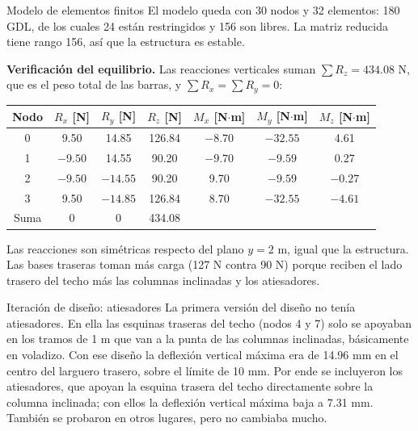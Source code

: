 \begin{desarrollo}{Modelo de elementos finitos}
El modelo queda con 30 nodos y 32 elementos: 180 GDL, de los cuales 24
están restringidos y 156 son libres. La matriz reducida tiene rango 156,
así que la estructura es estable.

\textbf{Verificación del equilibrio.} Las reacciones verticales suman
$\sum R_z=434.08$ N, que es el peso total de las barras, y
$\sum R_x=\sum R_y=0$:
\begin{center}
\renewcommand{\arraystretch}{1.15}
\small
\begin{tabular}{ccccccc}
\hline
Nodo & $R_x$ [N] & $R_y$ [N] & $R_z$ [N] & $M_x$ [N$\cdot$m] & $M_y$ [N$\cdot$m] & $M_z$ [N$\cdot$m]\\
\hline
0 & 9.50  & 14.85  & 126.84 & $-8.70$ & $-32.55$ & 4.61\\
1 & $-9.50$ & 14.55  & 90.20  & $-9.70$ & $-9.59$  & 0.27\\
2 & $-9.50$ & $-14.55$ & 90.20  & 9.70  & $-9.59$  & $-0.27$\\
3 & 9.50  & $-14.85$ & 126.84 & 8.70  & $-32.55$ & $-4.61$\\
\hline
Suma & 0 & 0 & 434.08 & & & \\
\hline
\end{tabular}
\end{center}
Las reacciones son simétricas respecto del plano $y=2$ m, igual que la
estructura. Las bases traseras toman más carga (127 N contra 90 N) porque
reciben el lado trasero del techo más las columnas inclinadas y los
atiesadores.
\end{desarrollo}

\begin{desarrollo}{Iteración de diseño: atiesadores}
La primera versión del diseño no tenía atiesadores. En ella las esquinas
traseras del techo (nodos 4 y 7) solo se apoyaban en los tramos de 1 m que
van a la punta de las columnas inclinadas, básicamente en voladizo. Con ese
diseño la deflexión vertical máxima era de 14.96 mm en el centro del larguero trasero,
sobre el límite de 10 mm. Por ende se incluyeron los atiesadores, que apoyan la
esquina trasera del techo directamente sobre la columna inclinada; con ellos la
deflexión vertical máxima baja a 7.31 mm. También se probaron en otros lugares, pero no
cambiaba mucho.
\end{desarrollo}

